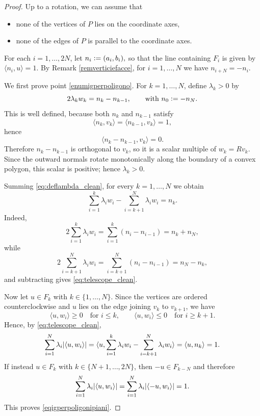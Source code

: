 \documentclass[10pt,a4paper]{amsart}
\DeclarePairedDelimiter{\valass}{\lvert}{\rvert} %
\newcommand{\prodscal}[2]{\langle{#1} , {#2} \rangle}
\begin{document}
\begin{proof}
Up to a rotation, we can assume that
\begin{itemize}
    \item none of the vertices of $P$ lies on the coordinate axes,
    \item none of the edges of $P$ is parallel to the coordinate axes.
\end{itemize}
For each $i=1,\dots,2N$, let
$n_i \vcentcolon = (a_i,b_i),$
so that the line containing $F_i$ is given by
$\prodscal{n_i}{u}=1.
$
By Remark \ref{remverticiefacce}, for $i=1,\dots,N$ we have
$n_{i+N}=-n_i$.

We first prove point \ref{enumigperpoligono}. For $k=1,\dots,N$, define $\lambda_k>0$ by
\begin{equation}\label{eq:deflambda_clean}
2\lambda_k w_k = n_k-n_{k-1},
\qquad\text{with }n_0\vcentcolon=-n_N.
\end{equation}
This is well defined, because both $n_k$ and $n_{k-1}$ satisfy
$$
\prodscal{n_k}{v_k}=\prodscal{n_{k-1}}{v_k}=1,
$$
hence
$$
\prodscal{n_k-n_{k-1}}{v_k}=0.
$$
Therefore $n_k-n_{k-1}$ is orthogonal to $v_k$, so it is a scalar multiple of
$w_k=Rv_k$.
Since the outward normals rotate monotonically along the boundary of a convex polygon, this scalar is positive; hence $\lambda_k>0$.

Summing \eqref{eq:deflambda_clean}, for every $k=1,\dots,N$ we obtain
\begin{equation}\label{eq:telescope_clean}
\sum_{i=1}^{k}\lambda_iw_i-\sum_{i=k+1}^{N}\lambda_iw_i=n_k.
\end{equation}
Indeed,
$$
2\sum_{i=1}^{k}\lambda_iw_i=\sum_{i=1}^{k}(n_i-n_{i-1})=n_k+n_N,
$$
while
$$
2\sum_{i=k+1}^{N}\lambda_iw_i=\sum_{i=k+1}^{N}(n_i-n_{i-1})=n_N-n_k,
$$
and subtracting gives \eqref{eq:telescope_clean}.

Now let $u\in F_k$ with $k\in\{1,\dots,N\}$. Since the vertices are ordered counterclockwise and $u$ lies on the edge joining $v_k$ to $v_{k+1}$, we have
$$
\prodscal{u}{w_i}\ge 0 \quad \text{for } i\le k,
\qquad
\prodscal{u}{w_i}\le 0 \quad \text{for } i\ge k+1.
$$
Hence, by \eqref{eq:telescope_clean},
$$
\sum_{i=1}^{N}\lambda_i\valass{\prodscal{u}{w_i}}
=
\prodscal{u}{\sum_{i=1}^{k}\lambda_iw_i-\sum_{i=k+1}^{N}\lambda_iw_i}
=
\prodscal{u}{n_k}
=1.
$$
If instead $u\in F_{k}$ with $k\in\{N+1,\dots,2N\}$, then $-u\in F_{k-N}$ and therefore
$$
\sum_{i=1}^{N}\lambda_i\valass{\prodscal{u}{w_i}}
=
\sum_{i=1}^{N}\lambda_i\valass{\prodscal{-u}{w_i}}
=1.
$$
This proves \eqref{eqigperpoligonipiani}.


\end{proof}
\end{document}
